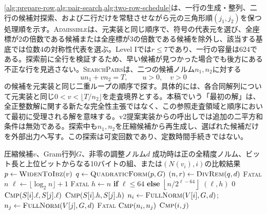 \documentclass[a4paper,10pt]{ltjsarticle}
\theoremstyle{definition}
\theoremstyle{remark}
\begin{document}
\cref{alg:prepare-row,alg:pair-search,alg:two-row-schedule}は、一行の生成・整列、二行の候補対探索、および二行だけを常駐させながら元の三角形順$(j_1,j_2)$を保つ処理順を示す。\textsc{Admissible}は、元実装と同じ順序で、符号の代表元を選び、全座標が2の倍数である候補または全座標が3の倍数である候補を除外し、該当する基底では位数4の対称性代表を選ぶ。Level Iでは$r\leq7$であり、一行の容量は624である。探索前に全行を検証するため、早い候補が見つかった場合でも後方にある不正な行を見逃さない。\textsc{SearchPairs}は、二つの候補ノルム$n_1,n_2$に対する
\begin{equation}
  u n_1 + v n_2 = T,\qquad u>0,\quad v>0
  \label{eq:finduv-diophantine}
\end{equation}
の候補を元実装と同じ二重ループの順序で探す。具体的には、各合同解列について元実装と同じ$0<v<\lfloor T/n_2\rfloor$を走査境界とする。本稿でいう「最初の解」は、全正整数解に関する新たな完全性主張ではなく、この参照走査領域と順序において最初に受理される解を意味する。v2提案実装からの呼出しでは追加の二平方和条件は無効である。探索中も$n_1,n_2$を圧縮候補から再生成し、選ばれた候補だけを外部出力へ写す。この探索は可変回数であり、定数時間手続きではない。

\begin{algorithm}[H]
  \caption{必要な場合に全精度値へ戻るノルム比較}
  \label{alg:sketch-order}
  \small
  \begin{algorithmic}[1]
    \Require 圧縮候補$v$、Gram行列$G$、非零の調整ノルム$d$
    \Ensure 成功時は正の全精度ノルム、ビット長と上位ビットからなる10バイトの組、または$(N(v_i),i)$の比較結果
      \State $p\gets\Call{WidenToIbz}{v}$
      \State $q\gets\Call{QuadraticForm}{p,G}$ 
      \State $(n,r)\gets\Call{DivRem}{q,d}$
        \State \Return \textsc{Fatal}
      \EndIf
      \State \Return $n$
    \EndFunction
      \State $\ell\gets\lfloor\log_2 n\rfloor+1$
        \State \Return \textsc{Fatal}
      \EndIf
      \State $h\gets n$ \textbf{if} $\ell\leq64$ \textbf{else} $\left\lfloor n/2^{\ell-64}\right\rfloor$
      \State \Return $(\ell,h)$ 
    \EndFunction
        \State \Return $0$
        \State \Return $\Call{Cmp}{S[i].\ell,S[j].\ell}$
        \State \Return $\Call{Cmp}{S[i].h,S[j].h}$
      \EndIf
      \State $n_i\gets\Call{FullNorm}{V[i],G,d}$; $n_j\gets\Call{FullNorm}{V[j],G,d}$
        \State \Return \textsc{Fatal}
        \State \Return $\Call{Cmp}{n_i,n_j}$
      \Else
        \State \Return $\Call{Cmp}{i,j}$ 
      \EndIf
    \EndFunction
  \end{algorithmic}
\end{algorithm}
\end{document}
